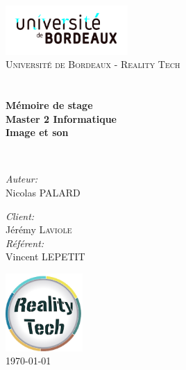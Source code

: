 \begin{titlepage}
\begin{center}

\includegraphics[width=0.35\textwidth]{./logos/ubx}~\\[1cm]

\textsc{\LARGE Université de Bordeaux - Reality Tech}\\[1.5cm]

\textsc{\Large }\\[0.5cm]

\HRule \\[0.4cm]

{\huge \bfseries Mémoire de stage\\
				Master 2 Informatique\\
				Image et son\\}

\HRule \\[1.5cm]

\begin{minipage}{0.4\textwidth}
\begin{flushleft} \large
\emph{Auteur:}\\
Nicolas \textsc{PALARD}\\
\end{flushleft}
\end{minipage}
\begin{minipage}{0.4\textwidth}
\begin{flushright} \large
\emph{Client:} \\
Jérémy \textsc{Laviole}\\
\emph{Référent:} \\
Vincent \textsc{LEPETIT}
\end{flushright}
\end{minipage}

\vfill

\includegraphics[width=0.22\textwidth]{./logos/logo-rt-notext}~\\[1cm]
{\large \today}

\end{center}
\end{titlepage}